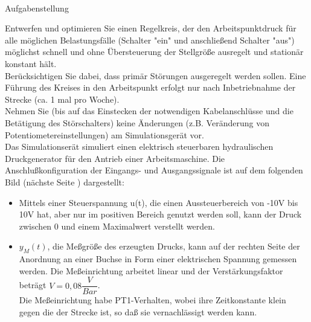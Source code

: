 \documentclass[11pt, a4paper,parskip=half]{article}
\begin{document}
\pagestyle{fancy}






\newpage
[Hansert]\\
\begin{huge}
Aufgabenstellung\\

\end{huge}
Entwerfen und optimieren Sie einen Regelkreis, der den Arbeitspunktdruck für alle möglichen Belastungsfälle (Schalter "ein" und anschließend Schalter "aus") möglichst schnell und ohne Übersteuerung der Stellgröße ausregelt und stationär konstant hält.\\

Berücksichtigen Sie dabei, dass primär Störungen ausgeregelt werden sollen. Eine Führung des Kreises in den Arbeitspunkt erfolgt nur nach Inbetriebnahme der Strecke (ca. 1 mal pro Woche).\\

Nehmen Sie (bis auf das Einstecken der notwendigen Kabelanschlüsse und die Betätigung des Störschalters) keine Änderungen (z.B. Veränderung von Potentiometereinstellungen) am Simulationsgerät vor.\\

Das Simulationserät simuliert einen elektrisch steuerbaren hydraulischen Druckgenerator für den Antrieb einer Arbeitsmaschine. Die Anschlußkonfiguration der Eingangs- und Ausgangssignale ist auf dem folgenden Bild (nächste Seite ) dargestellt:\\

\begin{itemize}
\item Mittels einer Steuerspannung u(t), die einen Aussteuerbereich von -10V bis 10V hat, aber nur im positiven Bereich genutzt werden soll, kann der Druck zwischen 0 und einem Maximalwert verstellt werden.

\item $y_{M} (t)$, die Meßgröße des erzeugten Drucks, kann auf der rechten Seite der Anordnung an einer Buchse in Form einer elektrischen Spannung gemessen werden. Die Meßeinrichtung arbeitet linear und der Verstärkungsfaktor beträgt $V =0,08 \dfrac{V}{Bar}$.\\
Die Meßeinrichtung habe PT1-Verhalten, wobei ihre Zeitkonstante klein gegen die der Strecke ist, so daß sie vernachlässigt werden kann.

\end{itemize}
\end{document}
